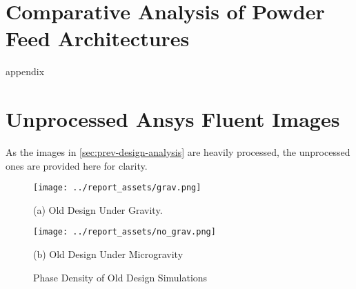 \chapter{Comparative Analysis of Powder Feed Architectures}

appendix\label{appendix:feed-architecture-analysis}

\chapter{Unprocessed Ansys Fluent Images}\label{sec:unprocessed-images}
As the images in \autoref{sec:prev-design-analysis} are heavily processed, the unprocessed ones are provided here for clarity.
\begin{figure}[htbp]
    \centering

    \begin{minipage}{0.45\textwidth}
        \centering
        \texttt{[image: ../report\_assets/grav.png]}
        \caption*{(a) Old Design Under Gravity.}
    \end{minipage}
    \hfill
    \begin{minipage}{0.45\textwidth}
        \centering
        \texttt{[image: ../report\_assets/no\_grav.png]}
        \caption*{(b) Old Design Under Microgravity}
    \end{minipage}
    \caption{Phase Density of Old Design Simulations}
\end{figure}